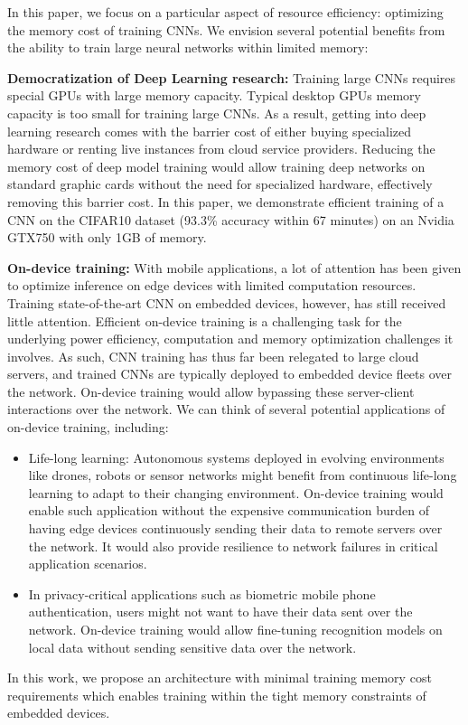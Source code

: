 \documentclass[twocolumn]{bmcart}
\begin{document}
In this paper, we focus on a particular aspect of resource efficiency: optimizing the memory cost of training CNNs. 
We envision several potential benefits from the ability to train large neural networks within limited memory:

\textbf{Democratization of Deep Learning research:} 
Training large CNNs requires special GPUs with large memory capacity. 
Typical desktop GPUs memory capacity is too small for training large CNNs.
As a result, getting into deep learning research comes with the barrier cost of either buying specialized hardware or renting live instances from cloud service providers. 
Reducing the memory cost of deep model training would allow training deep networks on standard graphic cards without the need for specialized hardware, effectively removing this barrier cost.
In this paper, we demonstrate efficient training of a CNN on the CIFAR10 dataset (93.3\% accuracy within 67 minutes) on an Nvidia GTX750 with only 1GB of memory.

\textbf{On-device training:}
With mobile applications, a lot of attention has been given to optimize inference on edge devices with limited computation resources.
Training state-of-the-art CNN on embedded devices, however, has still received little attention.
Efficient on-device training is a challenging task for the underlying power efficiency, computation and memory optimization challenges it involves.
As such, CNN training has thus far been relegated to large cloud servers, and trained CNNs are typically deployed to embedded device fleets over the network.
On-device training would allow bypassing these server-client interactions over the network.
We can think of several potential applications of on-device training, including:
\begin{itemize}
 \item Life-long learning: Autonomous systems deployed in evolving environments like drones, robots or sensor networks might benefit from continuous life-long learning to adapt to their changing environment.
On-device training would enable such application without the expensive communication burden of having edge devices continuously sending their data to remote servers over the network. It would also provide resilience to network failures in critical application scenarios.
 \item In privacy-critical applications such as biometric mobile phone authentication, users might not want to have their data sent over the network. 
On-device training would allow fine-tuning recognition models on local data without sending sensitive data over the network.
\end{itemize}
In this work, we propose an architecture with minimal training memory cost requirements which enables training within the tight memory constraints of embedded devices. 
\end{document}
